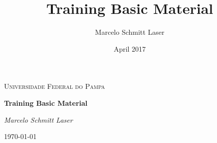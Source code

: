 \documentclass{report}
\title{Training Basic Material}
\author{Marcelo Schmitt Laser}
\date{April 2017}
\begin{document}

\begin{titlepage}
	\centering
	\par\vspace{3cm}
	{\scshape\LARGE Universidade Federal do Pampa \par}
	\vspace{4cm}
	{\huge\bfseries Training Basic Material\par}
	\vspace{2cm}
	{\Large\itshape Marcelo Schmitt Laser\par}

	\vfill

	{\large \today\par}
\end{titlepage}




\tableofcontents















\end{document}
